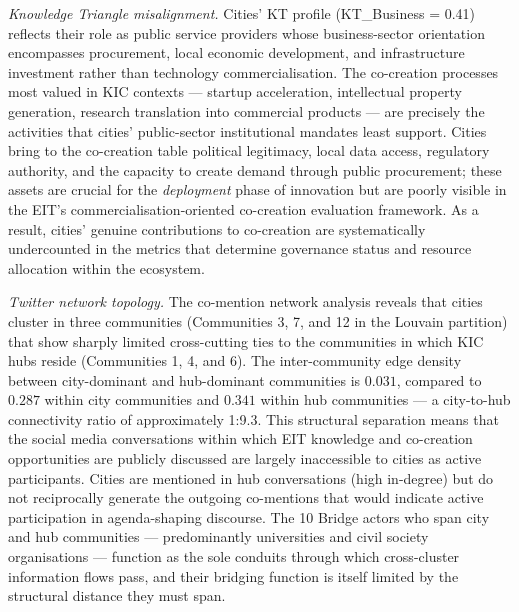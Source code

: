 \documentclass[review,12pt]{elsarticle}
\begin{document}
\textit{Knowledge Triangle misalignment.} Cities' KT profile (KT\_Business = 0.41) reflects their role as public service providers whose business-sector orientation encompasses procurement, local economic development, and infrastructure investment rather than technology commercialisation. The co-creation processes most valued in KIC contexts --- startup acceleration, intellectual property generation, research translation into commercial products --- are precisely the activities that cities' public-sector institutional mandates least support. Cities bring to the co-creation table political legitimacy, local data access, regulatory authority, and the capacity to create demand through public procurement; these assets are crucial for the \emph{deployment} phase of innovation but are poorly visible in the EIT's commercialisation-oriented co-creation evaluation framework. As a result, cities' genuine contributions to co-creation are systematically undercounted in the metrics that determine governance status and resource allocation within the ecosystem.

\textit{Twitter network topology.} The co-mention network analysis reveals that cities cluster in three communities (Communities 3, 7, and 12 in the Louvain partition) that show sharply limited cross-cutting ties to the communities in which KIC hubs reside (Communities 1, 4, and 6). The inter-community edge density between city-dominant and hub-dominant communities is $0.031$, compared to $0.287$ within city communities and $0.341$ within hub communities --- a city-to-hub connectivity ratio of approximately 1:9.3. This structural separation means that the social media conversations within which EIT knowledge and co-creation opportunities are publicly discussed are largely inaccessible to cities as active participants. Cities are mentioned in hub conversations (high in-degree) but do not reciprocally generate the outgoing co-mentions that would indicate active participation in agenda-shaping discourse. The 10 Bridge actors who span city and hub communities --- predominantly universities and civil society organisations --- function as the sole conduits through which cross-cluster information flows pass, and their bridging function is itself limited by the structural distance they must span.
\end{document}
